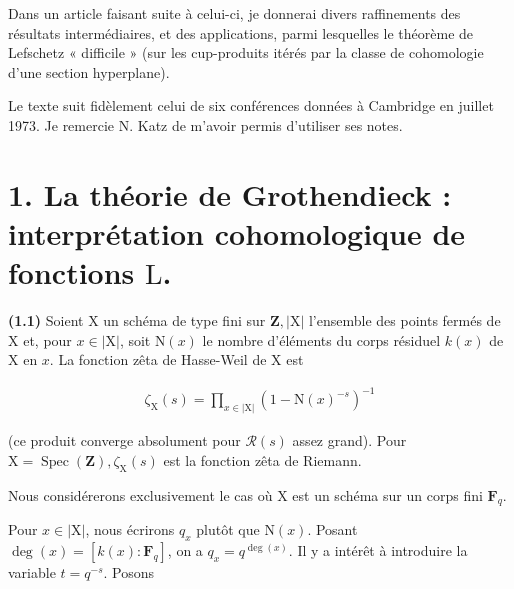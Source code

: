 \documentclass[10pt,leqno]{article}
\begin{document}
\noindent Dans un article faisant suite à celui-ci, je donnerai divers raffinements des résultats intermédiaires, et des applications, parmi lesquelles le théorème de Lefschetz « difficile » (sur les cup-produits itérés par la classe de cohomologie d’une section hyperplane).\par

\noindent Le texte suit fidèlement celui de six conférences données à Cambridge en juillet 1973. Je remercie \(\mathrm{N}\). Katz de m’avoir permis d’utiliser ses notes.\par

\section*{1. La théorie de Grothendieck : interprétation cohomologique de fonctions \(\mathrm{L}\).}

\noindent \textbf{(1.1)} Soient \(\mathrm{X}\) un schéma de type fini sur \(\mathbf{Z}, |\mathrm{X}|\) l’ensemble des points fermés de \(\mathrm{X}\) et, pour \(x\in |\mathrm{X}|\), soit \(\mathrm{N}(x)\) le nombre d’éléments du corps résiduel \(k(x)\) de \(\mathrm{X}\) en \(x\). La fonction zêta de Hasse-Weil de \(\mathrm{X}\) est\par

\begin{equation*}\begin{gathered}\zeta _{\mathrm{X}}(s) = \prod _{x\in |\mathrm{X}|} (1 -  \mathrm{N}(x)^{- s})^{- 1}\end{gathered}\tag{1.1.1}\end{equation*}

\noindent (ce produit converge absolument pour \(\mathcal{R} (s)\) assez grand). Pour \(\mathrm{X} = \operatorname{Spec}(\mathbf{Z}), \zeta _{\mathrm{X}}(s)\) est la fonction zêta de Riemann.\par

\noindent Nous considérerons exclusivement le cas où \(\mathrm{X}\) est un schéma sur un corps fini \(\mathbf{F}_{q}\).\par

\clearpage

\label{physical-3}

\noindent Pour \(x\in |\mathrm{X}|\), nous écrirons \(q_{x}\) plutôt que \(\mathrm{N}(x)\). Posant \(\operatorname{deg}(x)=[k(x):\mathbf{F}_{q}]\), on a \(q_{x}=q^{\operatorname{deg}(x)}\). Il y a intérêt à introduire la variable \(t=q^{- s}\). Posons\par
\end{document}
